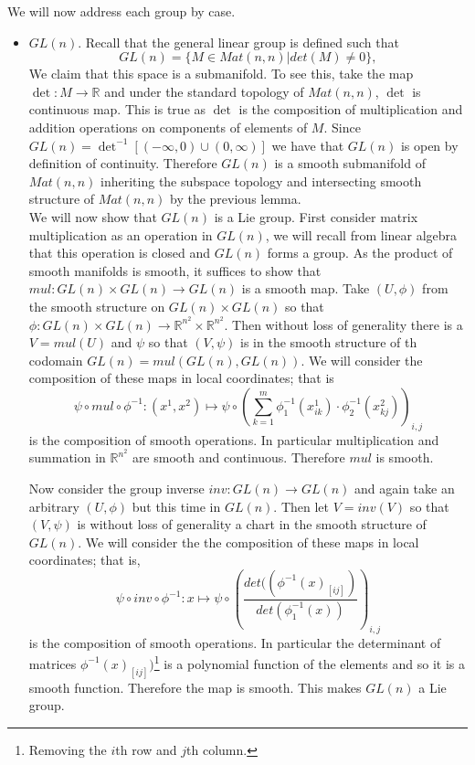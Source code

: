 \documentclass[11pt]{amsart}
\theoremstyle{definition}
\numberwithin{theorem}{section}
\numberwithin{definition}{section}
\numberwithin{equation}{section}
\def\det{\operatorname{det}}
\begin{document}
\noindent We will now address each group by case.
\begin{itemize}
	\item $GL(n).$ Recall that the general linear group is defined such that 
	\begin{equation*}
		GL(n) = \{ M \in Mat(n,n)\mathrel{}\Big|\mathrel{} det(M) \neq 0\},
	\end{equation*} We claim that this space is a submanifold. To see this, take the map $\det: M \to \mathbb{R}$ and under the standard topology of $Mat(n,n)$, $\det$ is continuous map. This is true as $\det$ is the composition of multiplication and addition operations on components of elements of $M$. Since $GL(n) = \det^{-1}[(-\infty, 0) \cup (0, \infty)]$ we have that $GL(n)$ is open by definition of continuity. Therefore $GL(n)$ is a smooth submanifold of $Mat(n,n)$ inheriting the subspace topology and intersecting smooth structure of $Mat(n,n)$ by the previous lemma. \\

	\noindent We will now show that $GL(n)$ is a Lie group. First consider matrix multiplication as an operation in $GL(n)$, we will recall from linear algebra that this operation is closed and $GL(n)$ forms a group. As the product of smooth manifolds is smooth, it suffices to show that $mul: GL(n) \times GL(n) \to GL(n)$ is a smooth map. Take $(U, \phi)$ from the smooth structure on $GL(n) \times GL(n)$ so that $\phi: GL(n) \times GL(n) \to \mathbb{R}^{n^2} \times \mathbb{R}^{n^2}$. Then without loss of generality there is a $V = mul(U)$ and $\psi$ so that $(V, \psi)$ is in the smooth structure of th codomain $GL(n) = mul(GL(n), GL(n)).$ We will consider the composition of these maps in local coordinates; that is
	\begin{equation*}
		\psi \circ mul \circ \phi^{-1}: (x^1, x^2) \mapsto \psi \circ \left(\sum_{k=1}^m \phi_1^{-1}(x^1_{ik})\cdot \phi_2^{-1}(x^2_{kj})\right)_{i,j}
	\end{equation*}
	is the composition of smooth operations. In particular multiplication and summation in $\mathbb{R}^{n^2}$ are smooth and continuous. Therefore $mul$ is smooth. 

	Now consider the group inverse $inv: GL(n) \to GL(n)$ and again take an arbitrary $(U, \phi)$ but this time in $GL(n)$. Then let $V = inv(V)$ so that $(V, \psi)$ is without loss of generality a chart in the smooth structure of $GL(n).$ We will consider the the composition of these maps in local coordinates; that is,
	\begin{equation*}
		\psi \circ inv \circ \phi^{-1}: x \mapsto \psi \circ \left(\frac{det((\phi^{-1}(x)_{[ij]})}{det(\phi_1^{-1}(x))} \right)_{i,j}
	\end{equation*}
	is the composition of smooth operations. In particular the determinant of matrices $\phi^{-1}(x)_{[ij]})$\footnote{Removing the $i$th row and $j$th column.} is a polynomial function of the elements and so it is a smooth function. Therefore the map is smooth. This makes $GL(n)$ a Lie group.


\end{itemize}
\end{document}
